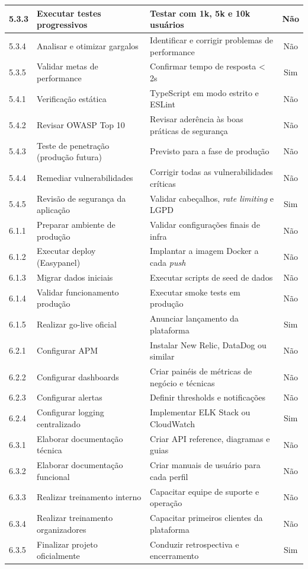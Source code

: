 \begin{table}[H]
\begin{tabular}{|p{0.9cm}|p{6.2cm}|p{5.7cm}|c|}
5.3.3 & Executar testes progressivos & Testar com 1k, 5k e 10k usuários & Não \\ \hline
5.3.4 & Analisar e otimizar gargalos & Identificar e corrigir problemas de performance & Não \\ \hline
5.3.5 & Validar metas de performance & Confirmar tempo de resposta < 2s & Sim \\ \hline
5.4.1 & Verificação estática & TypeScript em modo estrito e ESLint & Não \\ \hline
5.4.2 & Revisar OWASP Top 10 & Revisar aderência às boas práticas de segurança & Não \\ \hline
5.4.3 & Teste de penetração (produção futura) & Previsto para a fase de produção & Não \\ \hline
5.4.4 & Remediar vulnerabilidades & Corrigir todas as vulnerabilidades críticas & Não \\ \hline
5.4.5 & Revisão de segurança da aplicação & Validar cabeçalhos, \textit{rate limiting} e LGPD & Sim \\ \hline
6.1.1 & Preparar ambiente de produção & Validar configurações finais de infra & Não \\ \hline
6.1.2 & Executar deploy (Easypanel) & Implantar a imagem Docker a cada \textit{push} & Não \\ \hline
6.1.3 & Migrar dados iniciais & Executar scripts de seed de dados & Não \\ \hline
6.1.4 & Validar funcionamento produção & Executar smoke tests em produção & Não \\ \hline
6.1.5 & Realizar go-live oficial & Anunciar lançamento da plataforma & Sim \\ \hline
6.2.1 & Configurar APM & Instalar New Relic, DataDog ou similar & Não \\ \hline
6.2.2 & Configurar dashboards & Criar painéis de métricas de negócio e técnicas & Não \\ \hline
6.2.3 & Configurar alertas & Definir thresholds e notificações & Não \\ \hline
6.2.4 & Configurar logging centralizado & Implementar ELK Stack ou CloudWatch & Sim \\ \hline
6.3.1 & Elaborar documentação técnica & Criar API reference, diagramas e guias & Não \\ \hline
6.3.2 & Elaborar documentação funcional & Criar manuais de usuário para cada perfil & Não \\ \hline
6.3.3 & Realizar treinamento interno & Capacitar equipe de suporte e operação & Não \\ \hline
6.3.4 & Realizar treinamento organizadores & Capacitar primeiros clientes da plataforma & Não \\ \hline
6.3.5 & Finalizar projeto oficialmente & Conduzir retrospectiva e encerramento & Sim \\ \hline
\end{tabular}
\end{table}

